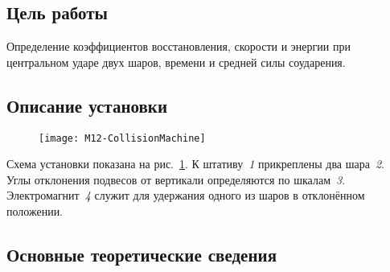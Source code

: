 \documentclass[a4paper, 12pt]{extarticle}
\begin{document}
\MTDTitlePage
\MTDInfoPage

\setcounter{section}{12}

\subsection{Цель работы}
Определение коэффициентов восстановления, скорости и энергии при центральном ударе двух шаров, времени и средней силы соударения. %
\subsection{Описание установки}

\begin{figure}[H]
\centering
\texttt{[image: M12-CollisionMachine]}
\caption{\label{fig:m12-equipment}}
\end{figure}

Схема установки показана на рис.~\ref{fig:m12-equipment}. К штативу~\emph{1} прикреплены два шара~\emph{2}. Углы отклонения подвесов от вертикали определяются по шкалам~\emph{3}. Электромагнит~\emph{4} служит для удержания одного из шаров в отклонённом положении.

\subsection{Основные теоретические сведения}
\end{document}
